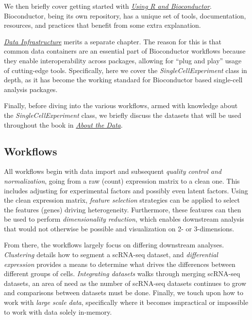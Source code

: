 \documentclass[]{book}
\begin{document}
We then briefly cover getting started with \protect\hyperlink{using-r-and-bioconductor}{\emph{Using R and Bioconductor}}. Bioconductor, being its own repository, has a unique set of tools, documentation, resources, and practices that benefit from some extra explanation.

\protect\hyperlink{data-infrastructure}{\emph{Data Infrastructure}} merits a separate chapter. The reason for this is that common data containers are an essential part of Bioconductor workflows because they enable interoperability across packages, allowing for ``plug and play'' usage of cutting-edge tools. Specifically, here we cover the \emph{SingleCellExperiment} class in depth, as it has become the working standard for Bioconductor based single-cell analysis packages.

Finally, before diving into the various workflows, armed with knowledge about the \emph{SingleCellExperiment} class, we briefly discuss the datasets that will be used throughout the book in \protect\hyperlink{about-the-data}{\emph{About the Data}}.

\hypertarget{workflows}{%
\subsection{Workflows}\label{workflows}}

All workflows begin with data import and subsequent \emph{quality control and normalization}, going from a raw (count) expression matrix to a clean one. This includes adjusting for experimental factors and possibly even latent factors. Using the clean expression matrix, \emph{feature selection} strategies can be applied to select the features (genes) driving heterogeneity. Furthermore, these features can then be used to perform \emph{dimensionality reduction}, which enables downstream analysis that would not otherwise be possible and visualization on 2- or 3-dimensions.

From there, the workflows largely focus on differing downstream analyses. \emph{Clustering} details how to segment a scRNA-seq dataset, and \emph{differential expression} provides a means to determine what drives the differences between different groups of cells. \emph{Integrating datasets} walks through merging scRNA-seq datasets, an area of need as the number of scRNA-seq datasets continues to grow and comparisons between datasets must be done. Finally, we touch upon how to work with \emph{large scale data}, specifically where it becomes impractical or impossible to work with data solely in-memory.
\end{document}
